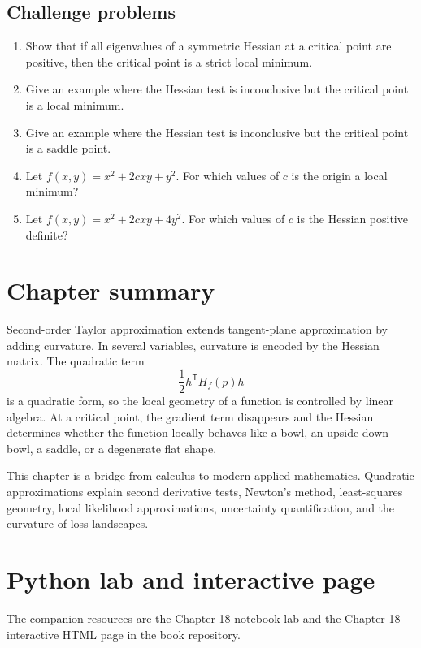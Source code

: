 \documentclass[11pt]{article}
\newcommand{\T}{^{\mathsf T}}
\begin{document}
\subsection*{Challenge problems}
\begin{enumerate}[start=26]
  \item Show that if all eigenvalues of a symmetric Hessian at a critical point are positive, then the critical point is a strict local minimum.
  \item Give an example where the Hessian test is inconclusive but the critical point is a local minimum.
  \item Give an example where the Hessian test is inconclusive but the critical point is a saddle point.
  \item Let $f(x,y)=x^2+2cxy+y^2$. For which values of $c$ is the origin a local minimum?
  \item Let $f(x,y)=x^2+2cxy+4y^2$. For which values of $c$ is the Hessian positive definite?
\end{enumerate}

\section{Chapter summary}

Second-order Taylor approximation extends tangent-plane approximation by adding curvature. In several variables, curvature is encoded by the Hessian matrix. The quadratic term
\[
\frac12h\T H_f(p)h
\]
is a quadratic form, so the local geometry of a function is controlled by linear algebra. At a critical point, the gradient term disappears and the Hessian determines whether the function locally behaves like a bowl, an upside-down bowl, a saddle, or a degenerate flat shape.

This chapter is a bridge from calculus to modern applied mathematics. Quadratic approximations explain second derivative tests, Newton's method, least-squares geometry, local likelihood approximations, uncertainty quantification, and the curvature of loss landscapes.

\section{Python lab and interactive page}
\begin{notebox}
The companion resources are the Chapter 18 notebook lab and the Chapter 18 interactive HTML page in the book repository.
\end{notebox}
\end{document}
